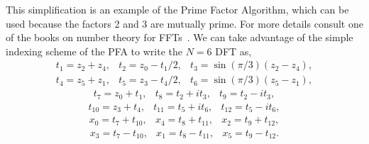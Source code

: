 \documentclass[fleqn,12pt]{article}
\begin{document}
%
This simplification is an example of the Prime Factor Algorithm, which
can be used because the factors 2 and 3 are mutually prime.  For more
details consult one of the books on number theory for
FFTs~\cite{elliott82,blahut}. We can take advantage of the simple
indexing scheme of the PFA to write the $N=6$ DFT as,
%
\begin{equation}
\begin{array}{lll}
t_1 = z_2 + z_4, &
t_2 = z_0 - t_1/2, &
t_3 = \sin(\pi/3) (z_2 - z_4),
\end{array}
\end{equation}
\begin{equation}
\begin{array}{lll}
t_4 = z_5 + z_1, &
t_5 = z_3 - t_4/2, &
t_6 = \sin(\pi/3) (z_5 - z_1), 
\end{array}
\end{equation}
\begin{equation}
\begin{array}{lll}
t_7 = z_0 + t_1, &
t_8 = t_2 + i t_3, &
t_9 = t_2 - i t_3,
\end{array}
\end{equation}
\begin{equation}
\begin{array}{lll}
t_{10} = z_3 + t_4, &
t_{11} = t_5 + i t_6, &
t_{12} = t_5 - i t_6, 
\end{array}
\end{equation}
\begin{equation}
\begin{array}{lll}
x_0 = t_7 + t_{10}, &
x_4 = t_8 + t_{11}, &
x_2 = t_9 + t_{12}, 
\end{array}
\end{equation}
\begin{equation}
\begin{array}{lll}
x_3 = t_7 - t_{10}, &
x_1 = t_8 - t_{11}, &
x_5 = t_9 - t_{12}.
\end{array}
\end{equation}
\end{document}
